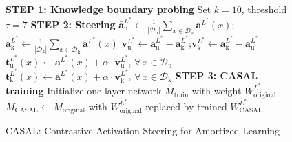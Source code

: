 \begin{figure}[htbp]
    \centering
    \begin{algorithm2e}[H]
    \DontPrintSemicolon
    \caption{CASAL: Contrastive Activation Steering for Amortized Learning}
    \label{alg:casal}
    \BlankLine
    \textbf{STEP 1: Knowledge boundary probing}\;
    Set $k=10$, threshold $\tau=7$\;
    \BlankLine
    \textbf{STEP 2: Steering} 
    $\mathbf{\bar{a}}^{L^*}_{\mathrm{u}} \gets \frac{1}{|\mathcal{D}_{\mathrm{u}}|}\sum_{x \in \mathcal{D}_{\mathrm{u}}}\mathbf{a}^{L^*}(x)$;\quad $\mathbf{\bar{a}}^{L^*}_{\mathrm{k}} \gets \frac{1}{|\mathcal{D}_{\mathrm{k}}|}\sum_{x \in \mathcal{D}_{\mathrm{k}}}\mathbf{a}^{L^*}(x)$\;
    $\mathbf{v}^{L^*}_{\mathrm{u}} \gets \mathbf{\bar{a}}^{L^*}_{\mathrm{u}}-\mathbf{\bar{a}}^{L^*}_{\mathrm{k}}$;\quad $\mathbf{v}^{L^*}_{\mathrm{k}} \gets \mathbf{\bar{a}}^{L^*}_{\mathrm{k}}-\mathbf{\bar{a}}^{L^*}_{\mathrm{u}}$\;
    $\mathbf{t}^{L^*}_{\mathrm{u}}(x) \gets \mathbf{a}^{L^*}(x) + \alpha \cdot \mathbf{v}^{L^*}_{\mathrm{u}}$, $\forall\, x \in \mathcal{D}_{\mathrm{u}}$ 
    $\mathbf{t}^{L^*}_{\mathrm{k}}(x) \gets \mathbf{a}^{L^*}(x) + \alpha \cdot \mathbf{v}^{L^*}_{\mathrm{k}}$, $\forall\, x \in \mathcal{D}_{\mathrm{k}}$ 
    \BlankLine
    \textbf{STEP 3: CASAL training}\;
    Initialize one-layer network $M_\text{train}$ with weight $W^{L^*}_{\text{original}}$\;
    $M_{\text{CASAL}} \gets M_{\text{original}}$ with $W^{L^*}_{\text{original}}$ replaced by trained $W^{L^*}_{\text{CASAL}}$\;
    \end{algorithm2e}
\end{figure}

